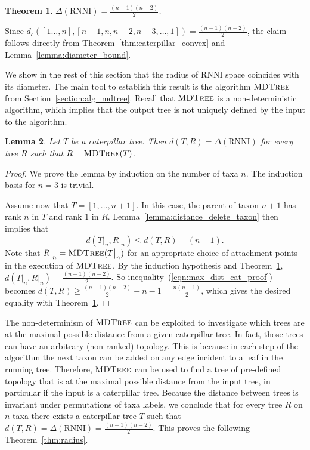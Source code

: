 \documentclass{amsart}
\newcommand{\rnni}{\mathrm{RNNI}}
\newcommand{\mdtree}{\textsc{MDTree}}
\newtheorem{theorem}{Theorem}
\newtheorem{lemma}[theorem]{Lemma}
\begin{document}
\begin{theorem}
$\Delta(\rnni) = \frac{(n-1)(n-2)}{2}$.
\label{thm:diameter}
\end{theorem}

\proof
Since $d_c([1\ldots,n], [n-1,n,n-2,n-3, \ldots, 1]) = \frac{(n-1)(n-2)}{2}$, the claim follows directly from Theorem~\ref{thm:caterpillar_convex} and Lemma~\ref{lemma:diameter_bound}.
\endproof

We show in the rest of this section that the radius of $\rnni$ space coincides with its diameter.
The main tool to establish this result is the algorithm $\mdtree$ from Section~\ref{section:alg_mdtree}.
Recall that $\mdtree$ is a non-deterministic algorithm, which implies that the output tree is not uniquely defined by the input to the algorithm.

\begin{lemma}
Let $T$ be a caterpillar tree.
Then $d(T, R) = \Delta(\rnni)$ for every tree $R$ such that $R = \mdtree(T)$.
\label{lemma:max_dist_caterpillar}
\end{lemma}

\begin{proof}
We prove the lemma by induction on the number of taxa $n$.
The induction basis for $n = 3$ is trivial.

Assume now that $T = [1, \ldots, n+1]$.
In this case, the parent of taxon $n+1$ has rank $n$ in $T$ and rank $1$ in $R$.
Lemma~\ref{lemma:distance_delete_taxon} then implies that
\begin{equation}
d(T\big|_n,R\big|_n) \leq d(T,R) - (n-1).
\label{eqn:max_dist_cat_proof}
\end{equation}
Note that $R\big|_n = \mdtree (T\big|_n)$ for an appropriate choice of attachment points in the execution of $\mdtree$.
By the induction hypothesis and Theorem~\ref{thm:diameter}, $d(T\big|_n,R\big|_n) = \frac{(n-1)(n-2)}{2}$.
So inequality~(\ref{eqn:max_dist_cat_proof}) becomes $d(T,R) \geq \frac{(n-1)(n-2)}{2} + n - 1 = \frac{n(n-1)}{2}$, which gives the desired equality with Theorem~\ref{thm:diameter}.
\end{proof}

The non-determinism of $\mdtree$ can be exploited to investigate which trees are at the maximal possible distance from a given caterpillar tree.
In fact, those trees can have an arbitrary (non-ranked) topology.
This is because in each step of the algorithm the next taxon can be added on any edge incident to a leaf in the running tree.
Therefore, $\mdtree$ can be used to find a tree of pre-defined topology that is at the maximal possible distance from the input tree, in particular if the input is a caterpillar tree.
Because the distance between trees is invariant under permutations of taxa labels, we conclude that for every tree $R$ on $n$ taxa there exists a caterpillar tree $T$ such that $d(T,R) = \Delta(\rnni) = \frac{(n-1)(n-2)}{2}$.
This proves the following Theorem~\ref{thm:radius}.
\end{document}
